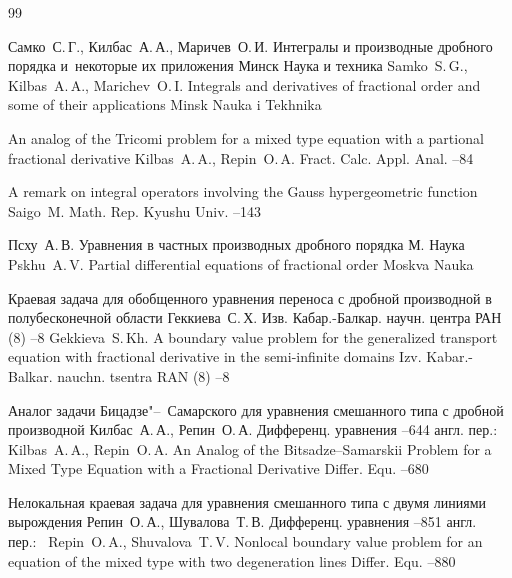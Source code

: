 \begin{thebibliography}{99}

\by Самко~С.\,Г., Килбас~А.\,А., Маричев~О.\,И.
\book Интегралы и производные дробного порядка и~некоторые их приложения
\publaddr Минск
\publ Наука и техника
\misctransl
\by Samko~S.\,G., Kilbas~A.\,A., Marichev~O.\,I.
\book Integrals and derivatives of fractional order and some of their applications
\publaddr Minsk
\publ Nauka i Tekhnika

\paper An analog of the Tricomi problem for a mixed type equation with a partional fractional derivative
\by Kilbas~A.\,A., Repin~O.\,A.
\jour Fract. Calc. Appl. Anal.
--84

\paper A remark on integral operators involving the Gauss hypergeometric function
\by Saigo~M.
\jour Math. Rep. Kyushu Univ.
--143

\by Псху~А.\,В.
\book Уравнения в частных производных дробного порядка
\publaddr М.
\publ Наука
\misctransl
\by Pskhu~A.\,V.
\book Partial differential equations of fractional order
\publaddr Moskva
\publ Nauka

\paper Краевая задача для обобщенного уравнения переноса с дробной производной в полубесконечной области
\by Геккиева~С.\,Х.
\jour Изв. Кабар.-Балкар. научн. центра РАН
(8)
--8
\misctransl
\by Gekkieva~S.\,Kh.
\paper A boundary value problem for the generalized transport equation with fractional derivative in the semi-infinite domains
\jour Izv. Kabar.-Balkar. nauchn. tsentra RAN
(8)
--8

\paper Аналог задачи Бицадзе"--~Самарского для уравнения смешанного типа с дробной производной
\by Килбас~А.\,А., Репин~О.\,А.
\jour Дифференц. уравнения
--644
\transl англ. пер.:~
\by Kilbas~A.\,A., Repin~O.\,A.
\paper An Analog of the Bitsadze–Samarskii Problem for a Mixed Type Equation with a Fractional Derivative 
\jour Differ. Equ.
--680 

\paper Нелокальная краевая задача для уравнения смешанного типа с двумя линиями вырождения
\by Репин~О.\,А., Шувалова~Т.\,В.
\jour Дифференц. уравнения
--851
\transl англ. пер.:~
\by Repin~O.\,A., Shuvalova~T.\,V.
\paper Nonlocal boundary value problem for an equation of the mixed type with two degeneration lines
\jour Differ. Equ.
--880 


\end{thebibliography}
